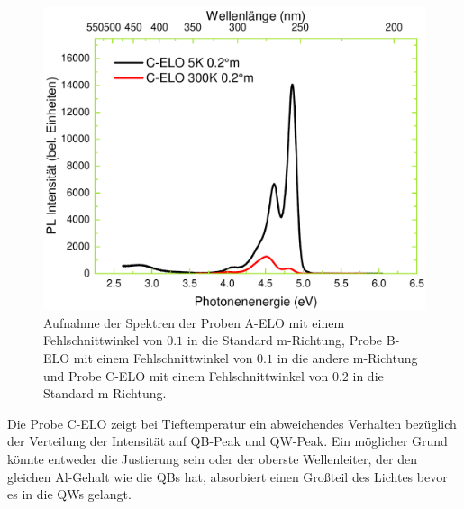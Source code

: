 \begin{figure}[ht]
\begin{minipage}[t]{0.49\textwidth}
    \includegraphics[width=\linewidth]{Bilder/TS4045/celo.pdf}
  \end{minipage}
	\caption{Aufnahme der Spektren der Proben A-ELO mit einem Fehlschnittwinkel von $0.1$ in die Standard m-Richtung, Probe B-ELO mit einem Fehlschnittwinkel von $0.1$ in die andere m-Richtung und Probe C-ELO mit einem Fehlschnittwinkel von $0.2$ in die Standard m-Richtung. }
	\label{fig:spectraselo}
\end{figure}
\noindent 
Die Probe C-ELO zeigt bei Tieftemperatur ein abweichendes Verhalten bezüglich der Verteilung der Intensität auf QB-Peak und QW-Peak. Ein möglicher Grund könnte entweder die Justierung sein oder der oberste Wellenleiter, der den gleichen Al-Gehalt wie die QBs hat, absorbiert einen Großteil des Lichtes bevor es in die QWs gelangt. 
